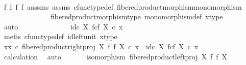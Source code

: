 \begin{isabellebody}
\ \ \ \ \ \ \ \ \isamarkupfalse%
\ f{}{}\ f{}\ f{}\ f{}\ a{\isacharunderscore}{\kern0pt}assms\ assms{\isacharparenleft}{\kern0pt}{}{\isacharparenright}{\kern0pt}\ cfunc{\isacharunderscore}{\kern0pt}type{\isacharunderscore}{\kern0pt}def\ fibered{\isacharunderscore}{\kern0pt}product{\isacharunderscore}{\kern0pt}morphism{\isacharunderscore}{\kern0pt}monomorphism\ \isanewline
\ \ \ \ \ \ \ \ \ \ \ \ \ \ fibered{\isacharunderscore}{\kern0pt}product{\isacharunderscore}{\kern0pt}morphism{\isacharunderscore}{\kern0pt}type\ monomorphism{\isacharunderscore}{\kern0pt}def\ x{\isacharunderscore}{\kern0pt}type\isanewline
\ \ \ \ \ \ \ \ \isamarkupfalse%
\ auto\isanewline
\ \ \ \ \isamarkupfalse%
\isanewline
\ \ \ \ \isamarkupfalse%
\ \isamarkupfalse%
\ {\isachardoublequoteopen}{\isachardot}{\kern0pt}{\isachardot}{\kern0pt}{\isachardot}{\kern0pt}\ {\isacharequal}{\kern0pt}\ id\isactrlsub c\ {\isacharparenleft}{\kern0pt}X\ \isactrlbsub f\isactrlesub {\isasymtimes}\isactrlsub c\isactrlbsub f\isactrlesub \ X{\isacharparenright}{\kern0pt}\ {\isasymcirc}\isactrlsub c\ x{\isachardoublequoteclose}\isanewline
\ \ \ \ \ \ \isamarkupfalse%
\ {\isacharparenleft}{\kern0pt}metis\ cfunc{\isacharunderscore}{\kern0pt}type{\isacharunderscore}{\kern0pt}def\ id{\isacharunderscore}{\kern0pt}left{\isacharunderscore}{\kern0pt}unit\ x{\isacharunderscore}{\kern0pt}type{\isacharparenright}{\kern0pt}\isanewline
\ \ \ \ \isamarkupfalse%
\ \isamarkupfalse%
\ {\isachardoublequoteopen}{\isacharparenleft}{\kern0pt}xx\ {\isasymcirc}\isactrlsub c\ fibered{\isacharunderscore}{\kern0pt}product{\isacharunderscore}{\kern0pt}right{\isacharunderscore}{\kern0pt}proj\ X\ f\ f\ X{\isacharparenright}{\kern0pt}\ {\isasymcirc}\isactrlsub c\ x\ {\isacharequal}{\kern0pt}\ id\isactrlsub c\ {\isacharparenleft}{\kern0pt}X\ \isactrlbsub f\isactrlesub {\isasymtimes}\isactrlsub c\isactrlbsub f\isactrlesub \ X{\isacharparenright}{\kern0pt}\ {\isasymcirc}\isactrlsub c\ x{\isachardoublequoteclose}\isanewline
\ \ \ \ \ \ \isamarkupfalse%
\ calculation\ \isamarkupfalse%
\ auto\isanewline
\ \ \isamarkupfalse%
\isanewline
\isanewline
\ \ \isamarkupfalse%
\ {\isachardoublequoteopen}isomorphism\ {\isacharparenleft}{\kern0pt}fibered{\isacharunderscore}{\kern0pt}product{\isacharunderscore}{\kern0pt}left{\isacharunderscore}{\kern0pt}proj\ X\ f\ f\ X{\isacharparenright}{\kern0pt}{\isachardoublequoteclose}\isanewline

\end{isabellebody}
